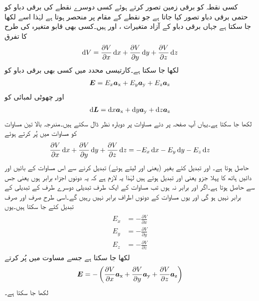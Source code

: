 کسی نقطہ کو برقی زمین تصور کرتے ہوئے کسی دوسرے نقطے کی برقی دباو کو حتمی برقی دباو تصور کیا جاتا ہے جو نقطے کے مقام پر منحصر ہوتا ہے لہٰذا اسے  لکھا جا سکتا ہے جہاں برقی دباو کے آزاد متغیرات ،  اور  ہیں۔کسی بھی قابو متغیرہ کی طرح  کا تفرق
\begin{align}\label{مساوات_توانائی_دباو_کارتیسی_تفرق}
\dif V=\frac{\partial V}{\partial x} \dif x+\frac{\partial V}{\partial y} \dif y +\frac{\partial V}{\partial z} \dif z
\end{align}
لکھا جا سکتا ہے۔کارتیسی محدد میں کسی بھی برقی دباو کو
\begin{align}\label{مساوات_توانائی_میدان}
{\ensuremath{{\boldsymbol{E}}}}=E_x {\boldsymbol{a}}_{\textup{x}}+ E_y {\boldsymbol{a}}_{\textup{y}}+E_z {\boldsymbol{a}}_{\textup{z}}
\end{align}
اور  چھوٹی لمبائی کو
\begin{align}\label{مساوات_توانائی_کارتیسی_چھوٹا_فاصلہ}
\dif \kvec{L}=\dif x \ax+\dif y \ay+\dif z \az
\end{align}
لکھا جا سکتا ہے۔یہاں آپ صفحہ  پر دئے مساوات  پر دوبارہ نظر ڈال سکتے ہیں۔مندرجہ بالا تین مساوات کو مساوات  میں پُر کرتے ہوئے
\begin{align}\label{مساوات_توانائی_دباو_اور_میدان}
\frac{\partial V}{\partial x} \dif x+\frac{\partial V}{\partial y} \dif y +\frac{\partial V}{\partial z} \dif z=-E_x \dif x-E_y \dif y-E_z \dif z
\end{align}
حاصل ہوتا ہے۔ اور  تبدیل کئے بغیر (یعنی  اور  لیتے ہوئے)  تبدیل کرنے سے اس مساوات کے بائیں اور دائیں ہاتھ کا پہلا جزو یعنی  اور  تبدیل ہوتے ہیں لہٰذا یہ لازم ہے کہ یہ دونوں اجزاء برابر ہوں یعنی  جس سے  حاصل ہوتا ہے۔اگر  اور  برابر نہ ہوں تب مساوات کے ایک طرف تبدیلی دوسرے طرف کے تبدیلی کے برابر نہیں ہو گی اور یوں مساوات کے دونوں اطراف برابر نہیں رہیں گے۔اسی طرح صرف  اور صرف  تبدیل کئے جا سکتا ہیں۔یوں
\begin{gather}
\begin{aligned}
E_x&=-\frac{\partial V}{\partial x}\\
E_y&=-\frac{\partial V}{\partial y}\\
E_z&=-\frac{\partial V}{\partial z}
\end{aligned}
\end{gather}
لکھا جا سکتا ہے جسے مساوت  میں پُر کرتے
\begin{align}\label{مساوات_توانائی_ڈھلان_تعریف_الف}
{\ensuremath{{\boldsymbol{E}}}}=-\left( \frac{\partial V}{\partial x} {\boldsymbol{a}}_{\textup{x}}+\frac{\partial V}{\partial y} {\boldsymbol{a}}_{\textup{y}}+\frac{\partial V}{\partial z} {\boldsymbol{a}}_{\textup{z}}\right)
\end{align}
لکھا جا سکتا ہے۔

